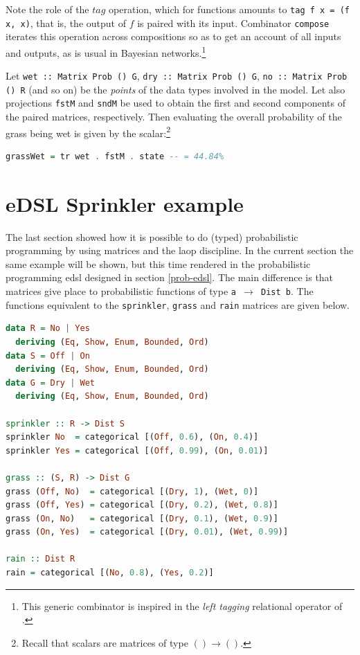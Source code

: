 \documentclass[
  oneside,
  11pt, a4paper,
  footinclude=true,
  headinclude=true,
  cleardoublepage=empty
]{scrbook}
\theoremstyle{definition}
\theoremstyle{definition}
\begin{document}
        Note the role of the $tag$ operation, which for functions amounts to \texttt{tag f x = (f x, x)}, that is, the output of $f$ is paired with its input. Combinator \texttt{compose} iterates this operation across compositions so as to get an account of all inputs and outputs, as is usual in Bayesian networks.\footnote{This generic combinator is inspired in the \emph{left tagging} relational operator of \citep{Bu01}.} 
        
        Let \texttt{wet :: Matrix Prob () G}, \texttt{dry :: Matrix Prob () G}, \texttt{no :: Matrix Prob () R} (and so on) be the \emph{points} of the data types involved in the model. Let also projections \texttt{fstM} and \texttt{sndM} be used to obtain the first and second components of the paired matrices, respectively. Then evaluating the overall probability of the grass being wet is given by
        the scalar:\footnote{Recall that scalars are matrices of type \ensuremath{\mathrm{()}\to
        \mathrm{()}}.} 
        \begin{lstlisting}[language=Haskell, caption={Probability of grass being wet calculation}, captionpos=b]
grassWet = tr wet . fstM . state -- = 44.84%
        \end{lstlisting}{}
        
        \section{eDSL Sprinkler example}
        
        The last section showed how it is possible to do (typed) probabilistic programming by using matrices and the \gls{laop} discipline. In the current section the same example will be shown, but this time rendered in the probabilistic programming \gls{edsl} designed in section \ref{prob-edsl}. The main difference is that matrices give place to probabilistic functions of type \texttt{a $\to$ Dist b}. The functions equivalent to the \texttt{sprinkler}, \texttt{grass} and \texttt{rain} matrices are given below.
        
        \begin{lstlisting}[language=Haskell, caption={Example probabilistic functions}, captionpos=b]
data R = No | Yes
  deriving (Eq, Show, Enum, Bounded, Ord)
data S = Off | On
  deriving (Eq, Show, Enum, Bounded, Ord)
data G = Dry | Wet
  deriving (Eq, Show, Enum, Bounded, Ord)

sprinkler :: R -> Dist S
sprinkler No  = categorical [(Off, 0.6), (On, 0.4)]
sprinkler Yes = categorical [(Off, 0.99), (On, 0.01)]

grass :: (S, R) -> Dist G
grass (Off, No)  = categorical [(Dry, 1), (Wet, 0)]
grass (Off, Yes) = categorical [(Dry, 0.2), (Wet, 0.8)]
grass (On, No)   = categorical [(Dry, 0.1), (Wet, 0.9)]
grass (On, Yes)  = categorical [(Dry, 0.01), (Wet, 0.99)]

rain :: Dist R
rain = categorical [(No, 0.8), (Yes, 0.2)]
        \end{lstlisting}{}
        
\end{document}
